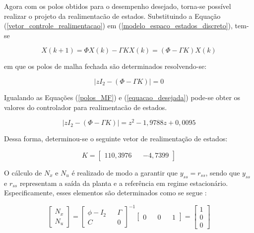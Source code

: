 Agora com os polos obtidos para o desempenho desejado, torna-se possível realizar o projeto da realimentacão de estados. Substituindo a Equação (\ref{vetor_controle_realimentacao}) em (\ref{modelo_espaco_estados_discreto}), tem-se

\begin{equation}
     X(k+1) = \Phi X(k) - \varGamma KX(k) = (\Phi-\varGamma K)X(k)
     \label{modelo_espaco_estados_discreto2}
\end{equation}

\noindent em que os polos de malha fechada são determinados resolvendo-se:

\begin{equation}
    | z I_2 - (\Phi-\varGamma K) | = 0
    \label{polos_MF}
\end{equation}

Igualando as Equações (\ref{polos_MF}) e (\ref{equacao_desejada}) pode-se obter os valores do controlador para realimentacão de estados.

\begin{equation}
    | z I_2 - (\Phi-\varGamma K) | = z^2-1,9788z+0,0095
    \label{realimentacao_estados}
\end{equation}

Dessa forma, determinou-se o seguinte vetor de realimentação de estados:

\begin{equation}
    K = 
    \begin{bmatrix}
        110,3976 && -4,7399
    \end{bmatrix}
    \label{controlador_realimentacao}
\end{equation}

O cálculo de $N_x$ e $N_u$ é realizado de modo a garantir que $y_{ss} = r_{ss}$, sendo que  $y_{ss}$ e $r_{ss}$ representam a saída da planta e a referência em regime estacionário. Especificamente, esses elementos são determinados como se segue \cite{franklin2013sistemas}:

\begin{equation}
    \begin{bmatrix}
        N_x \\ N_u
    \end{bmatrix}
    =
    \begin{bmatrix}
        \phi-I_2 && \varGamma \\ C && 0
    \end{bmatrix}
    ^{-1}
    \begin{bmatrix}
        0 && 0 && 1
    \end{bmatrix}
    =
    \begin{bmatrix}
        1 \\ 0 \\ 0
    \end{bmatrix}
    \label{ganhos_Nxu}
\end{equation}

